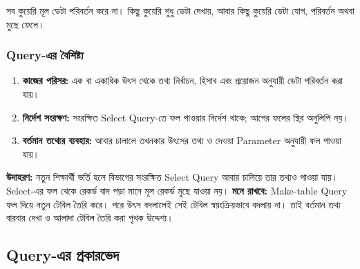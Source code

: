 সব কুয়েরি মূল ডেটা পরিবর্তন করে না। কিছু কুয়েরি শুধু ডেটা দেখায়, আবার কিছু কুয়েরি ডেটা যোগ, পরিবর্তন
অথবা মুছে ফেলে।

\subsubsection{Query-এর বৈশিষ্ট্য}
\begin{enumerate}
\item \textbf{কাজের পরিসর:} এক বা একাধিক উৎস থেকে তথ্য নির্বাচন, হিসাব এবং প্রয়োজন অনুযায়ী ডেটা পরিবর্তন করা যায়।
\item \textbf{নির্দেশ সংরক্ষণ:} সংরক্ষিত Select Query-তে ফল পাওয়ার নির্দেশ থাকে; আগের ফলের স্থির অনুলিপি নয়।
\item \textbf{বর্তমান তথ্যের ব্যবহার:} আবার চালালে তখনকার উৎসের তথ্য ও দেওয়া Parameter অনুযায়ী ফল পাওয়া যায়।
\end{enumerate}
\textbf{উদাহরণ:} নতুন শিক্ষার্থী ভর্তি হলে বিভাগের সংরক্ষিত Select Query আবার চালিয়ে তার তথ্যও পাওয়া যায়। Select-এর ফল থেকে রেকর্ড বাদ পড়া মানে মূল রেকর্ড মুছে যাওয়া নয়।
\textbf{মনে রাখবে:} Make-table Query ফল দিয়ে নতুন টেবিল তৈরি করে। পরে উৎস বদলালেই সেই টেবিল স্বয়ংক্রিয়ভাবে বদলায় না। তাই বর্তমান তথ্য বারবার দেখা ও আলাদা টেবিল তৈরি করা পৃথক উদ্দেশ্য।

\subsection{Query-এর প্রকারভেদ}

\begingroup\setlength{\LTleft}{0pt}\setlength{\LTright}{\fill}\setlength{\LTpre}{2pt}\setlength{\LTpost}{2pt}

\small
\setlength{\tabcolsep}{4pt}
\renewcommand{\arraystretch}{1.10}


